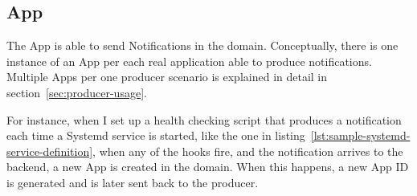 \subsection{App}\label{sec:app}

The App is able to send Notifications
in the domain.
Conceptually,
there is one instance of an App
per each real application
able to produce notifications.
Multiple Apps per one producer scenario
is explained in detail in section~\ref{sec:producer-usage}.

For instance,
when I set up a health checking script
that produces a notification each time
a Systemd service is started,
like the one in listing~\ref{lst:sample-systemd-service-definition},
when any of the hooks fire,
and the notification arrives to the backend,
a new App is created in the domain.
When this happens,
a new App \ac{ID} is generated
and is later sent back to the producer.
